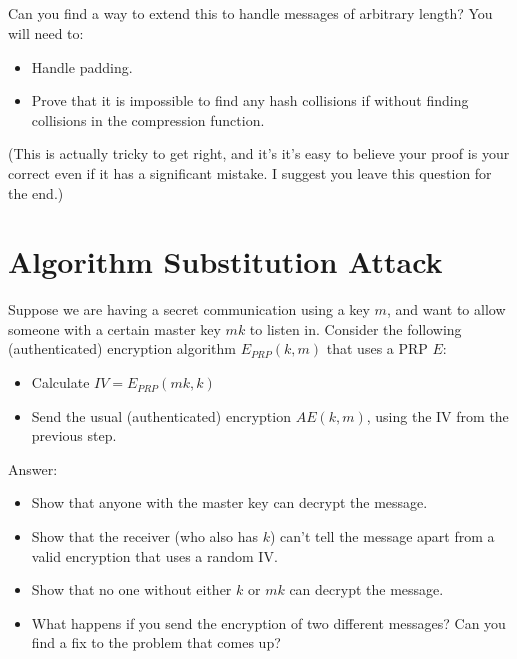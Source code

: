 \documentclass[12pt]{article}
\begin{document}

\subsection{}
Can you find a way to extend this to handle messages of arbitrary length? You will need to:

\begin{itemize}
\item Handle padding.
\item Prove that it is impossible to find any hash collisions if without finding collisions in the compression function.
\end{itemize}

(This is actually tricky to get right, and it's it's easy to believe your proof is your correct even if it has a significant mistake. I suggest you leave this question for the end.)



\section{Algorithm Substitution Attack}

Suppose we are having a secret communication using a key $m$, and want to allow someone with a certain master key $mk$ to listen in. Consider the following (authenticated) encryption algorithm $E_{PRP}(k, m)$ that uses a PRP $E$:

\begin{itemize}
\item Calculate $IV = E_{PRP}(mk, k)$
\item Send the usual (authenticated) encryption $AE(k, m)$, using the IV from the previous step.
\end{itemize}

Answer:

\begin{itemize}
\item Show that anyone with the master key can decrypt the message.
\item Show that the receiver (who also has $k$) can't tell the message apart from a valid encryption that uses a random IV.
\item Show that no one without either $k$ or $mk$ can decrypt the message.
\item What happens if you send the encryption of two different messages? Can you find a fix to the problem that comes up?
\end{itemize}
\end{document}
